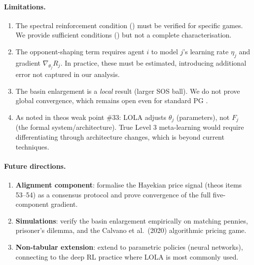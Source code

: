 \documentclass[11pt,a4paper]{article}
\begin{document}
\paragraph{Limitations.}
\begin{enumerate}
    \item The spectral reinforcement condition () must be verified for specific games. We provide sufficient conditions () but not a complete characterisation.
    \item The opponent-shaping term requires agent $i$ to model $j$'s learning rate $\eta_j$ and gradient $\nabla_{\theta_j} R_j$. In practice, these must be estimated, introducing additional error not captured in our analysis.
    \item The basin enlargement is a \emph{local} result (larger SOS ball). We do not prove global convergence, which remains open even for standard PG \cite{giannou2022}.
    \item As noted in theos weak point \#33: LOLA adjusts $\theta_j$ (parameters), not $F_j$ (the formal system/architecture). True Level 3 meta-learning would require differentiating through architecture changes, which is beyond current techniques.
\end{enumerate}

\paragraph{Future directions.}
\begin{enumerate}
    \item \textbf{Alignment component}: formalise the Hayekian price signal (theos items 53--54) as a consensus protocol and prove convergence of the full five-component gradient.
    \item \textbf{Simulations}: verify the basin enlargement empirically on matching pennies, prisoner's dilemma, and the Calvano et al.\ (2020) algorithmic pricing game.
    \item \textbf{Non-tabular extension}: extend to parametric policies (neural networks), connecting to the deep RL practice where LOLA is most commonly used.
\end{enumerate}
\end{document}
